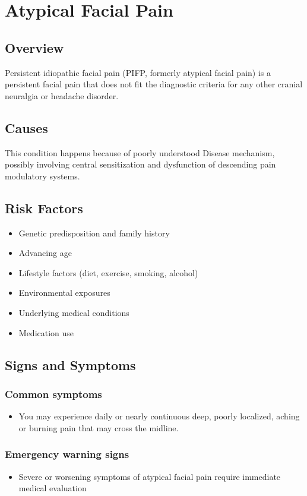 \chapter{Atypical Facial Pain}
\label{sec:Atypical Facial Pain}

\section{Overview}
Persistent idiopathic facial pain (PIFP, formerly atypical facial pain) is a persistent facial pain that does not fit the diagnostic criteria for any other cranial neuralgia or headache disorder.
\section{Causes}
This condition happens because of poorly understood Disease mechanism, possibly involving central sensitization and dysfunction of descending pain modulatory systems.     
\section{Risk Factors}

\begin{itemize}[noitemsep]
  \item Genetic predisposition and family history
  \item Advancing age
  \item Lifestyle factors (diet, exercise, smoking, alcohol)
  \item Environmental exposures
  \item Underlying medical conditions
  \item Medication use
\end{itemize}
\section{Signs and Symptoms}

\subsection{Common symptoms}
\begin{itemize}[noitemsep]
  \item You may experience daily or nearly continuous deep, poorly localized, aching or burning pain that may cross the midline. 
  \end{itemize}

\subsection{Emergency warning signs}
\begin{itemize}[noitemsep]
  \item Severe or worsening symptoms of atypical facial pain require immediate medical evaluation
\end{itemize}
